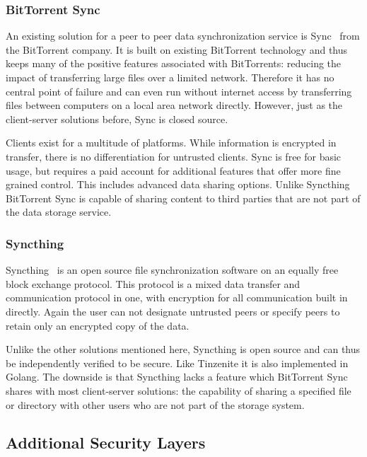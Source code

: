 \subsubsection{BitTorrent Sync}
\label{subs:BitTorrent Sync}

An existing solution for a peer to peer data synchronization service is Sync~\cite{web:site:bittorrent_sync} from the BitTorrent company.
It is built on existing BitTorrent technology and thus keeps many of the positive features associated with BitTorrents: reducing the impact of transferring large files over a limited network.
Therefore it has no central point of failure and can even run without internet access by transferring files between computers on a local area network directly.
However, just as the client-server solutions before, Sync is closed source.

Clients exist for a multitude of platforms.
While information is encrypted in transfer, there is no differentiation for untrusted clients.
Sync is free for basic usage, but requires a paid account for additional features that offer more fine grained control.
This includes advanced data sharing options.
Unlike Syncthing BitTorrent Sync is capable of sharing content to third parties that are not part of the data storage service.

\subsubsection{Syncthing}
\label{subs:Syncthing}

Syncthing~\cite{web:site:synthing} is an open source file synchronization software on an equally free block exchange protocol.
This protocol is a mixed data transfer and communication protocol in one, with encryption for all communication built in directly.
Again the user can not designate untrusted peers or specify peers to retain only an encrypted copy of the data.

Unlike the other solutions mentioned here, Syncthing is open source and can thus be independently verified to be secure.
Like Tinzenite it is also implemented in Golang.
The downside is that Syncthing lacks a feature which BitTorrent Sync shares with most client-server solutions: the capability of sharing a specified file or directory with other users who are not part of the storage system.

\subsection{Additional Security Layers}
\label{sub:Additional Security Layers}

